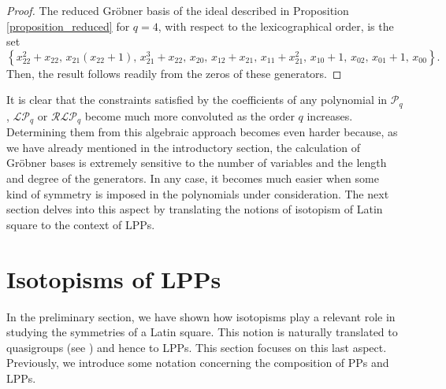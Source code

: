\documentclass[pdflatex,sn-mathphys-num]{sn-jnl}
\theoremstyle{thmstyleone}%
\begin{document}
\begin{proof} The reduced Gr\"obner basis of the ideal described in Proposition \ref{proposition_reduced} for $q=4$, with respect to the lexicographical order, is the set
{\small\[\left\{
x_{22}^2+x_{22},\,
x_{21}(x_{22}+1),\,
x_{21}^3+x_{22},\,
x_{20},\,
x_{12}+x_{21},\,
x_{11}+x_{21}^2,\,
x_{10}+1,\,
x_{02},\,
x_{01}+1,\,
x_{00}\right\}.\]}
Then, the result follows readily from the zeros of these generators.    
\end{proof}

\vspace{0.5cm}

It is clear that the constraints satisfied by the coefficients of any polynomial in $\mathcal{P}_q$, $\mathcal{LP}_q$ or $\mathcal{RLP}_q$ become much more convoluted as the order $q$ increases. Determining them from this algebraic approach becomes even harder because, as we have already mentioned in the introductory section, the calculation of Gr\"obner bases is extremely sensitive to the number of variables and the length and degree of the generators. In any case, it becomes much easier when some kind of symmetry is imposed in the polynomials under consideration. The next section delves into this aspect by translating the notions of isotopism of Latin square to the context of LPPs.

\section{Isotopisms of LPPs}\label{sec:symmetries}

In the preliminary section, we have shown how isotopisms play a relevant role in studying the symmetries of a Latin square. This notion is naturally translated to quasigroups (see \cite{Albert1943}) and hence to LPPs. This section focuses on this last aspect. Previously, we introduce some notation concerning the composition of PPs and LPPs.
\end{document}
